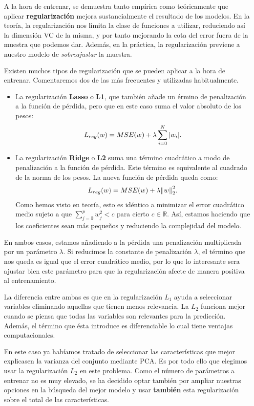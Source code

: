 \documentclass[a4paper, 20pt]{article}
\newcommand{\R}{\mathbb R}
\begin{document}
A la hora de entrenar, se demuestra tanto empírica como teóricamente que aplicar \textbf{regularización} mejora sustancialmente el resultado de los modelos. En la teoría, la regularización nos limita la clase de funciones a utilizar, reduciendo así la dimensión VC de la misma, y por tanto mejorando la cota del error fuera de la muestra que podemos dar. Además, en la práctica, la regularización previene a nuestro modelo de \emph{sobreajustar} la muestra.

Existen muchos tipos de regularización que se pueden aplicar a la hora de entrenar. Comentaremos dos de las más frecuentes y utilizadas habitualmente. 

\begin{itemize}
   

    \item La regularización \textbf{Lasso} o \textbf{L1}, que también añade un érmino de penalización a la función de pérdida, pero que en este caso suma el valor absoluto de los pesos:
    $$
    L_{reg}(w) = MSE(w) + \lambda \sum_{i = 0}^N \abs{w_i}.
    $$

    \item La regularización \textbf{Ridge} o \textbf{L2} suma una término cuadrático a modo de penalización a la función de pérdida. Este término es equivalente al cuadrado de la norma de los pesos.  La nueva función de pérdida queda como:
    $$
    L_{reg}(w) = MSE(w) + \lambda \norm{w}_2^2 .
    $$
    Como hemos visto en teoría, esto es idéntico a minimizar el error cuadrático medio sujeto a que $\sum_{j = 0}^p w_j^2 < c$ para cierto $c\in \R$. Así, estamos haciendo que los coeficientes sean más pequeños y reduciendo la complejidad del modelo.
\end{itemize}

En ambos casos, estamos añadiendo a la pérdida una penalización multiplicada por un parámetro $\lambda$. Si reducimos la constante de penalización $\lambda$, el término que nos queda es igual que el error cuadrático medio, por lo que lo interesante sera ajustar bien este parámetro para que la regularización afecte de manera positiva al entrenamiento.

La diferencia entre ambas es que en la regularización $L_1$ ayuda a seleccionar variables eliminando aquellas que tienen menos relevancia. La $L_2$ funciona mejor cuando se piensa que todas las variables son relevantes para la predicción. Además, el término que ésta introduce es diferenciable lo cual tiene ventajas computacionales. 

En este caso ya habíamos tratado de seleccionar las características que mejor explicasen la varianza del conjunto mediante PCA. Es por todo ello que elegimos usar la regularización $L_2$ en este problema. Como el número de parámetros a entrenar no es muy elevado, se ha decidido optar también por ampliar nuestras opciones en la búsqueda del mejor modelo y usar \textbf{también} esta regularización sobre el total de las características. 
\end{document}
